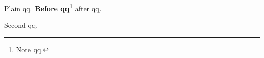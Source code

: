\documentclass{article}
\begin{document}
Plain qq. {\bfseries Before qq\footnote{\mdseries Note qq.}} after qq.

Second qq.
\end{document}
